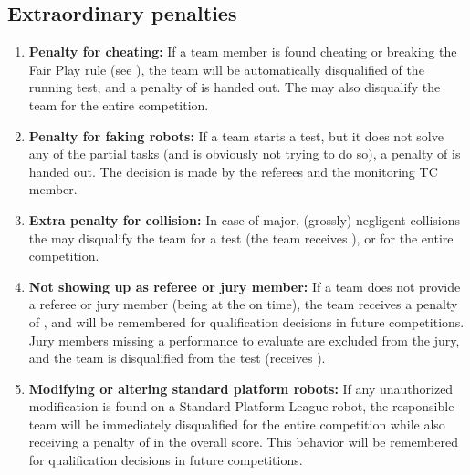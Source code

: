 \subsection{Extraordinary penalties}\label{rule:extraordinary_penalties}
\begin{enumerate}
	\item \textbf{Penalty for cheating:} If a team member is found cheating or breaking the Fair Play rule (see ), the team will be automatically disqualified of the running test, and a penalty of  is handed out.
	The  may also disqualify the team for the entire competition.

	\item \textbf{Penalty for faking robots:} If a team starts a test, but it does not solve any of the partial tasks (and is obviously not trying to do so), a penalty of  is handed out.
	The decision is made by the referees and the monitoring TC member.

	\item \textbf{Extra penalty for collision:} In case of major, (grossly) negligent collisions the  may disqualify the team for a test (the team receives ), or for the entire competition.

	\item \textbf{Not showing up as referee or jury member:} If a team does not provide a referee or jury member (being at the \Arena{} on time), the team receives a penalty of , and will be remembered for qualification decisions in future competitions.\\
	Jury members missing a performance to evaluate are excluded from the jury, and the team is disqualified from the test (receives ).

	\item \textbf{Modifying or altering standard platform robots:} If any unauthorized modification is found on a Standard Platform League robot, the responsible team will be immediately disqualified for the entire competition while also receiving a penalty of  in the overall score. This behavior will be remembered for qualification decisions in future competitions.\\
\end{enumerate}

